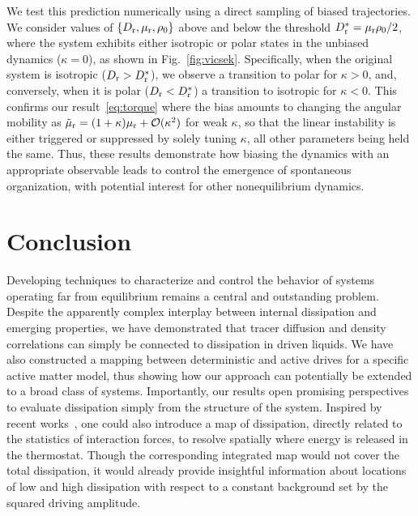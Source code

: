 \documentclass[superscriptaddress, twocolumn, prx, longbibliography, nofootinbib]{revtex4-1}
\begin{document}
We test this prediction numerically using a direct sampling of biased trajectories. We consider values of $\{D_{\rm r},\mu_{\rm r},\rho_0\}$ above and below the threshold $D_{\rm r}^*=\mu_{\rm r}\rho_0/2$, where the system exhibits either isotropic or polar states in the unbiased dynamics ($\kappa=0$), as shown in Fig.~\ref{fig:vicsek}. Specifically, when the original system is isotropic ($D_{\rm r}>D_{\rm r}^*$), we observe a transition to polar for $\kappa>0$, and, conversely, when it is polar ($D_{\rm r}<D_{\rm r}^*$) a transition to isotropic for $\kappa<0$. This confirms our result~\eqref{eq:torque} where the bias amounts to changing the angular mobility as $\tilde\mu_{\rm r}=(1+\kappa)\mu_{\rm r} + {\cal O}(\kappa^2)$ for weak $\kappa$, so that the linear instability is either triggered or suppressed by solely tuning $\kappa$, all other parameters being held the same. Thus, these results demonstrate how biasing the dynamics with an appropriate observable leads to control the emergence of spontaneous organization, with potential interest for other nonequilibrium dynamics.




\section{Conclusion}

Developing techniques to characterize and control the behavior of systems operating far from equilibrium remains a central and outstanding problem. Despite the apparently complex interplay between internal dissipation and emerging properties, we have demonstrated that tracer diffusion and density correlations can simply be connected to dissipation in driven liquids. We have also constructed a mapping between deterministic and active drives for a specific active matter model, thus showing how our approach can potentially be extended to a broad class of systems. Importantly, our results open promising perspectives to evaluate dissipation simply from the structure of the system. Inspired by recent works~\cite{Nardini2017, Spinney2018}, one could also introduce a map of dissipation, directly related to the statistics of interaction forces, to resolve spatially where energy is released in the thermostat. Though the corresponding integrated map would not cover the total dissipation, it would already provide insightful information about locations of low and high dissipation with respect to a constant background set by the squared driving amplitude.
\end{document}
